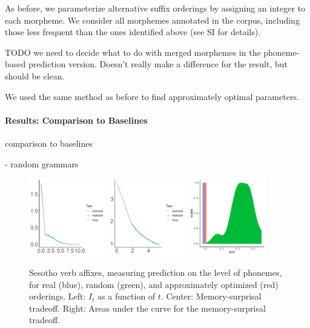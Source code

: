 As before, we parameterize alternative suffix orderings by assigning an integer to each morpheme.
We consider all morphemes annotated in the corpus, including those less frequent than the ones identified above (see SI for details).

TODO we need to decide what to do with merged morphemes in the phoneme-based prediction version. Doesn't really make a difference for the result, but should be clean.

We used the same method as before to find approximately optimal parameters.

\paragraph{Results: Comparison to Baselines}
comparison to baselines

- random grammars



\begin{figure}
	\begin{center}
\includegraphics[width=0.3\textwidth]{figures/Sesotho-suffixes-byPhonemes-it.pdf}
\includegraphics[width=0.3\textwidth]{figures/Sesotho-suffixes-byPhonemes-memsurp.pdf}
\includegraphics[width=0.3\textwidth]{figures/Sesotho-suffixes-byPhonemes-auc-hist.pdf}
\end{center}
	\caption{Sesotho verb affixes, measuring prediction on the level of phonemes, for real (blue), random (green), and approximately optimized (red) orderings. Left: $I_t$ as a function of $t$. Center: Memory-surprisal tradeoff. Right: Areas under the curve for the memory-surprisal tradeoff.}\label{fig:jap-phon}
\end{figure}


